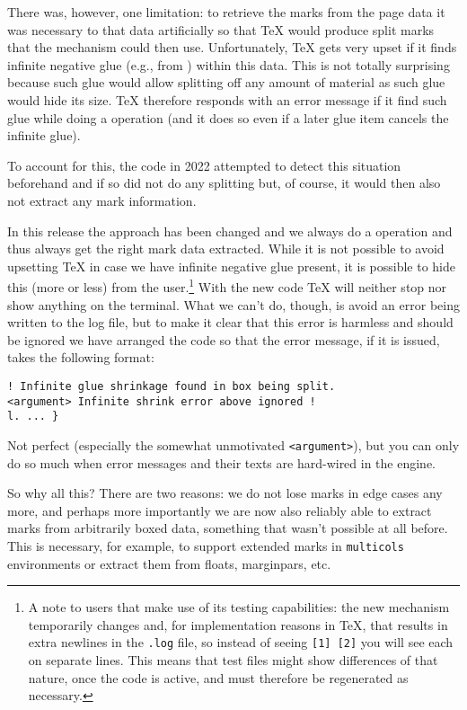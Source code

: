 \documentclass{ltnews}
\makeatletter
\providecommand\env[1]{\texttt{#1}}
\providecommand\env[1]{\texttt{#1}}
\def\verbatim@font{\normalsize\ttfamily}
\providecommand\tubcommand[1]{}
\makeatother
\begin{document}
There was, however, one limitation: to retrieve the marks from the
page data it was necessary to  that data artificially so
that \TeX{} would produce split marks that the mechanism could then
use. Unfortunately, \TeX{} gets very upset if it finds infinite
negative glue (e.g., from ) within this data. This is not
totally surprising because such glue would allow splitting off any
amount of material as such glue would hide its size. \TeX{}
therefore responds with an error message if it find such glue while
doing a  operation (and it does so even if a later glue
item cancels the infinite glue).

To account for this, the code in 2022 attempted to detect this
situation beforehand and if so did not do any splitting but, of
course, it would then also not extract any mark information.

In this release the approach has been changed and we always do a
 operation and thus always get the right mark data
extracted. While it is not possible to avoid upsetting \TeX{} in case
we have infinite negative glue present, it is possible to hide this
(more or less) from the user.\footnote{A note to  users
that make use of its testing capabilities: the new mechanism
temporarily changes  and, for implementation
reasons in \TeX{}, that results in extra newlines in the \texttt{.log}
file, so instead of seeing \texttt{[1] [2]} you will see each on
separate lines. This means that test files might show differences of
that nature, once the code is active, and must therefore be
regenerated as necessary.} With the new code \TeX{} will neither stop
nor show anything on the terminal. What we can't do, though, is
avoid an error being written to the log file, but to make it clear
that this error is harmless and should be ignored we have arranged the
code so that the error message, if it is issued, takes the following
format:
\begingroup
\makeatletter
\def\verbatim@font{%
  \small\ttfamily}
\makeatother
\begin{verbatim}
! Infinite glue shrinkage found in box being split.
<argument> Infinite shrink error above ignored !
l. ... }
\end{verbatim}
Not perfect (especially the somewhat unmotivated \texttt{<argument>}),
but you can only do so much when error messages and their texts are
hard-wired in the engine.

\endgroup

So why all this? There are two reasons: we do not lose marks in edge
cases any more, and perhaps more importantly we are now also reliably
able to extract marks from arbitrarily boxed data, something that
wasn't possible at all before. This is necessary, for example, to
support extended marks in \env{multicols} environments or extract them
from floats, marginpars, etc.\tubcommand{\looseness-1}
\end{document}

